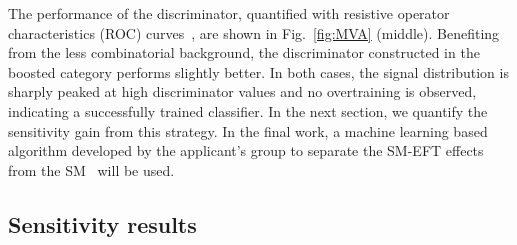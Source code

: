 \documentclass[a4paper,11pt]{article}
\begin{document}
The performance of the discriminator, quantified with resistive operator characteristics (ROC) curves~\cite{FAWCETT2006861}, are shown in Fig.~\ref{fig:MVA} (middle). 
Benefiting from the less combinatorial background,
the discriminator constructed in the boosted category performs slightly better. 
In both cases, the signal distribution is sharply peaked at high discriminator values and no overtraining is observed, indicating a successfully trained classifier.
In the next section, we quantify the sensitivity gain from this strategy.
In the final work, a machine learning based algorithm developed by the applicant's group to separate the SM-EFT effects from the SM~\cite{Chatterjee:2021nms} will be used.

\subsection{Sensitivity results}
\end{document}
